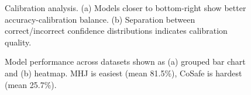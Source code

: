 \begin{figure}[t]
  \centering
  \hfill
  \caption{Calibration analysis. (a) Models closer to bottom-right show better accuracy-calibration balance. (b) Separation between correct/incorrect confidence distributions indicates calibration quality.}
  \label{fig:calibration-combined}
\end{figure}

\begin{figure}[t]
  \centering
  \hfill
  \caption{Model performance across datasets shown as (a) grouped bar chart and (b) heatmap. MHJ is easiest (mean 81.5\%), CoSafe is hardest (mean 25.7\%).}
  \label{fig:dataset-combined}
\end{figure}

